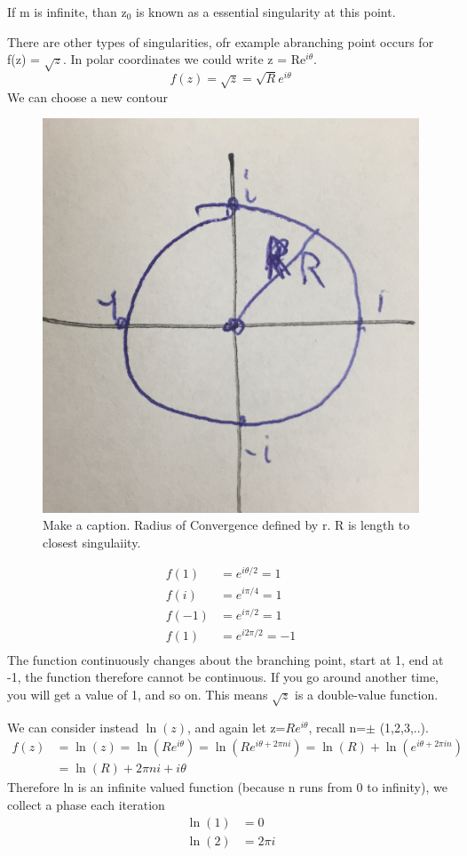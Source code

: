 \documentclass{article}
\newcommand{\be}{\begin{equation}}
\newcommand{\ee}{\end{equation}}
\begin{document}
If m is infinite, than z$_0$ is known as a essential singularity at this point. 

There are other types of singularities, ofr example  abranching point occurs for f(z) = $\sqrt{z}$. 
In polar coordinates we could write z = Re$^{i\theta}$. 
\be
    f(z) = \sqrt{z} = \sqrt{R}e^{i\theta}
    \ee
We can choose a new contour
\begin{figure}[H]
  \centering
    \includegraphics[scale=0.2]{Figures/circle.png}
    \caption{Make a caption. Radius of Convergence defined by r. R is length to closest singulaiity.}
\end{figure}
\be
\begin{split}
    f(1) &= e^{i\theta/2} = 1\\
    f(i) &= e^{i\pi/4} = 1\\
    f(-1) &= e^{i\pi/2} = 1\\
    f(1) &= e^{i2\pi/2} = -1\\
\end{split}
\ee
The function continuously changes about the branching point, start at 1, end at -1, the function therefore cannot be continuous. 
If you go around another time, you will get a value of 1, and so on.
This means $\sqrt{z}$ is a double-value function.


We can consider instead $\ln(z)$, and again let z=$Re^{i\theta}$, recall n=$\pm$ (1,2,3,..). 
\be
\begin{split}
    f(z) &= \ln(z) = \ln(Re^{i\theta}) = \ln(Re^{i\theta+2\pi ni}) = \ln(R) + \ln(e^{i\theta + 2\pi in})\\
    &= \ln(R) + 2\pi ni + i\theta
\end{split} 
\ee
Therefore ln is an infinite valued function (because n runs from 0 to infinity), we collect a phase each iteration
\be
\begin{split}
    \ln(1) &= 0\\
    \ln(2) &= 2\pi i\\
\end{split}
\ee
\end{document}
